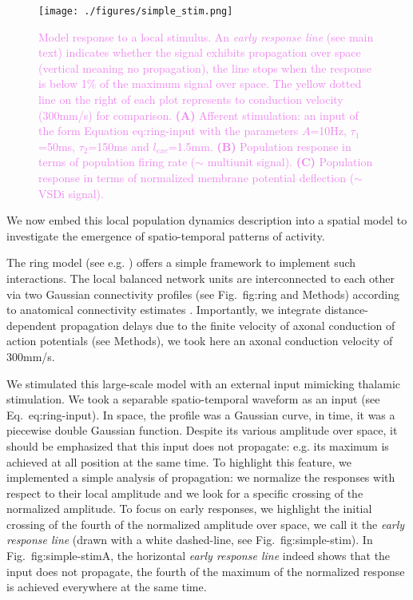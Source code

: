 \documentclass[8pt, colorlinks, a4paper]{article}
\renewcommand\ref{}
\newcommand{\corr}[1]{{\textcolor{violet}{#1}}}
\begin{document}
\begin{figure*}
\centering
\texttt{[image: ./figures/simple\_stim.png]}

\caption{\label{fig:simple-stim}\corr{Model response to a local
    stimulus. An \emph{early response line} (see main text) indicates
    whether the signal exhibits propagation over space (vertical
    meaning no propagation), the line stops when the response is below
    1\% of the maximum signal over space. The yellow dotted line on
    the right of each plot represents to conduction velocity (300mm/s)
    for comparison. \textbf{(A)} Afferent stimulation: an input of the
    form Equation \ref{eq:ring-input} with the parameters \(A\)=10Hz,
    \(\tau_1\)=50ms, \(\tau_2\)=150ms and
    \(l_{exc}\)=1.5mm. \textbf{(B)} Population response in terms of
    population firing rate (\(\sim\) multiunit signal).  \textbf{(C)}
    Population response in terms of normalized membrane potential
    deflection (\(\sim\) VSDi signal).}}

\end{figure*}

We now embed this local population dynamics description into a spatial
model to investigate the emergence of spatio-temporal patterns of
activity.

The ring model (see e.g. \cite{Hansel1996}) offers a simple framework
to implement such interactions. The local balanced network units are
interconnected to each other via two Gaussian connectivity profiles
(see Fig.~\ref{fig:ring} and Methods) according to anatomical
connectivity estimates \cite{Buzas2006}. Importantly, we integrate
distance-dependent propagation delays due to the finite velocity of
axonal conduction of action potentials (see Methods), we took here an
axonal conduction velocity of 300mm/s.

We stimulated this large-scale model with an external input mimicking
thalamic stimulation. We took a separable spatio-temporal waveform as
an input (see Eq.~\ref{eq:ring-input}). In space, the profile was a
Gaussian curve, in time, it was a piecewise double Gaussian
function. Despite its various amplitude over space, it should be
emphasized that this input does not propagate: e.g. its maximum is
achieved at all position at the same time. To highlight this feature,
we implemented a simple analysis of propagation: we normalize the
responses with respect to their local amplitude and we look for a
specific crossing of the normalized amplitude. To focus on early
responses, we highlight the initial crossing of the fourth of the
normalized amplitude over space, we call it the \emph{early response
  line} (drawn with a white dashed-line, see
Fig.~\ref{fig:simple-stim}). In Fig.~\ref{fig:simple-stim}A, the
horizontal \emph{early response line} indeed shows that the input does
not propagate, the fourth of the maximum of the normalized response is
achieved everywhere at the same time.
\end{document}
